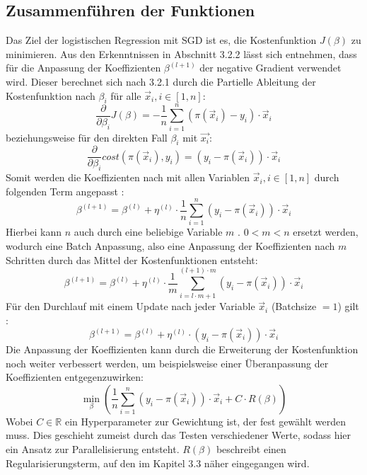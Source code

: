 \subsection{Zusammenführen der Funktionen}
Das Ziel der logistischen Regression mit SGD ist es, die Kostenfunktion $J(\beta)$ zu minimieren. Aus den Erkenntnissen in Abschnitt 3.2.2 lässt sich entnehmen, dass für die Anpassung der Koeffizienten $\beta^{(l+1)}$ der negative Gradient verwendet wird. Dieser berechnet sich nach 3.2.1 durch die Partielle Ableitung der Kostenfunktion nach $\beta_i$ für alle $\vec x_i, i \in [1,n]$:
\begin{displaymath}
\dfrac{\partial}{\partial \beta_i} J(\beta) = - \frac{1}{n} \sum_{i=1}^n (\pi(\vec x_i) - y_i)\cdot \vec x_i
\end{displaymath}
beziehungsweise für den direkten Fall $\beta_i$ mit $\vec{x_i}$:
\begin{displaymath}
\dfrac{\partial}{\partial \beta_i} cost(\pi(\vec x_i),y_i) = (y_i -\pi(\vec x_i))\cdot \vec x_i
\end{displaymath}
Somit werden die Koeffizienten nach mit allen Variablen $\vec x_i, i \in [1,n]$ durch folgenden Term angepasst \cite{HER}:
\begin{displaymath}
\beta^{(l+1)} = \beta^{(l)} + \eta^{(l)} \cdot \frac{1}{n} \sum_{i=1}^n (y_i-\pi(\vec x_i)) \cdot \vec x_i
\end{displaymath}
Hierbei kann $n$ auch durch eine beliebige Variable $m\text{ . }0< m < n$ ersetzt werden, wodurch eine Batch Anpassung, also eine Anpassung der Koeffizienten nach $m$ Schritten durch das Mittel der Kostenfunktionen entsteht:
\begin{displaymath}
\beta^{(l+1)} = \beta^{(l)} + \eta^{(l)} \cdot \frac{1}{m} \sum_{i=l\cdot m + 1}^{(l+1) \cdot m} (y_i-\pi(\vec x_i)) \cdot \vec x_i
\end{displaymath}
Für den Durchlauf mit einem Update nach jeder Variable $\vec x_i$ (Batchsize $=1$) gilt \cite{COH}:
\begin{displaymath}
\beta^{(l+1)} = \beta^{(l)} + \eta^{(l)} \cdot (y_i-\pi(\vec x_i)) \cdot \vec x_i
\end{displaymath}
Die Anpassung der Koeffizienten kann durch die Erweiterung der Kostenfunktion noch weiter verbessert werden, um beispielsweise einer Überanpassung der Koeffizienten entgegenzuwirken: \begin{displaymath}
\min_\beta \left( \frac{1}{n} \sum_{i=1}^n (y_i - \pi(\vec x_i))\cdot \vec x_i +C \cdot R(\beta)\right) 
\end{displaymath}
Wobei $C \in \mathbb R$ ein Hyperparameter zur Gewichtung ist, der fest gewählt werden muss. Dies geschieht zumeist durch das Testen verschiedener Werte, sodass hier ein Ansatz zur Parallelisierung entsteht. $R(\beta)$ beschreibt einen Regularisierungsterm, auf den im Kapitel 3.3 näher eingegangen wird.
